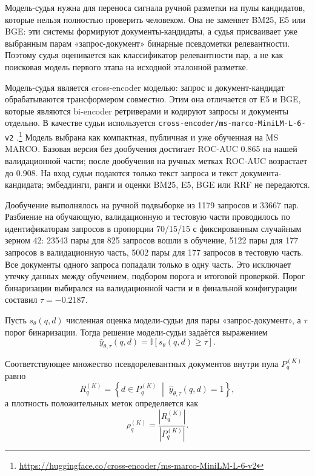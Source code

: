 \documentclass[runningheads,a4paper]{llncs}
\begin{document}
Модель-судья нужна для переноса сигнала ручной разметки на пулы кандидатов, которые нельзя полностью проверить человеком. Она не заменяет BM25, E5 или BGE: эти системы формируют документы-кандидаты, а судья присваивает уже выбранным парам «запрос-документ» бинарные псевдометки релевантности. Поэтому судья оценивается как классификатор релевантности пар, а не как поисковая модель первого этапа на исходной эталонной разметке.

Модель-судья является cross-encoder моделью: запрос и документ-кандидат обрабатываются трансформером совместно. Этим она отличается от E5 и BGE, которые являются bi-encoder ретриверами и кодируют запросы и документы отдельно. В качестве судьи используется \texttt{cross-encoder/ms-marco-MiniLM-L-6-v2} \cite{wang2020minilm,reimers2019sentencebert}.\footnote{\url{https://huggingface.co/cross-encoder/ms-marco-MiniLM-L-6-v2}} Модель выбрана как компактная, публичная и уже обученная на MS MARCO. Базовая версия без дообучения достигает ROC-AUC 0.865 на нашей валидационной части; после дообучения на ручных метках ROC-AUC возрастает до 0.908. На вход судьи подаются только текст запроса и текст документа-кандидата; эмбеддинги, ранги и оценки BM25, E5, BGE или RRF не передаются.

Дообучение выполнялось на ручной подвыборке из 1179 запросов и 33667 пар. Разбиение на обучающую, валидационную и тестовую части проводилось по идентификаторам запросов в пропорции 70/15/15 с фиксированным случайным зерном 42: 23543 пары для 825 запросов вошли в обучение, 5122 пары для 177 запросов \textemdash{} в валидационную часть, 5002 пары для 177 запросов \textemdash{} в тестовую часть. Все документы одного запроса попадали только в одну часть. Это исключает утечку данных между обучением, подбором порога и итоговой проверкой. Порог бинаризации выбирался на валидационной части и в финальной конфигурации составил $\tau = -0.2187$.

Пусть $s_\theta(q,d)$ \textemdash{} численная оценка модели-судьи для пары «запрос-документ», а $\tau$ \textemdash{} порог бинаризации. Тогда решение модели-судьи задаётся выражением
\begin{equation}
\label{eq:judge}
\hat y_{\theta,\tau}(q,d) = \mathbb{I}\left[s_\theta(q,d) \ge \tau\right].
\end{equation}

Соответствующее множество псевдорелевантных документов внутри пула $P_q^{(K)}$ равно
\begin{equation}
\label{eq:positive-set}
R_q^{(K)} = \left\{ d \in P_q^{(K)} \; \middle| \; \hat y_{\theta,\tau}(q,d) = 1 \right\},
\end{equation}
а плотность положительных меток определяется как
\begin{equation}
\label{eq:density}
\rho_q^{(K)} = \frac{|R_q^{(K)}|}{|P_q^{(K)}|}.
\end{equation}
\end{document}
